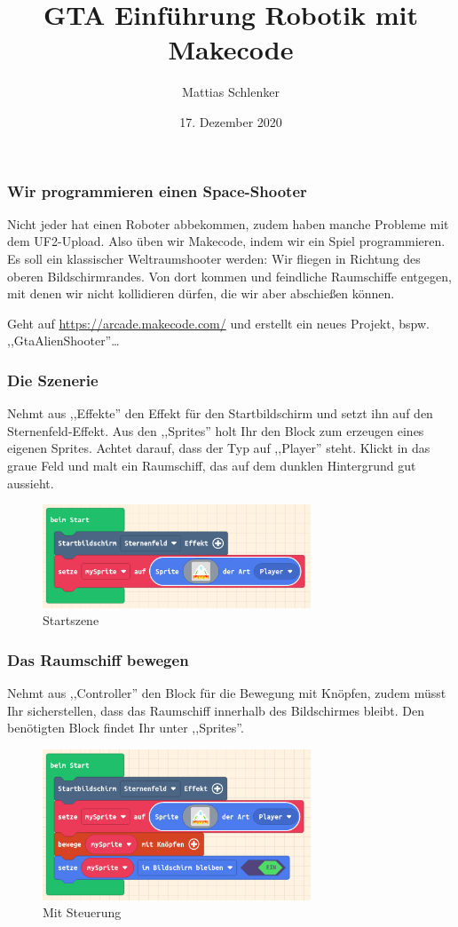 \documentclass{beamer}
\title{GTA Einführung Robotik mit Makecode}
\author{Mattias Schlenker}
\institute{Wilhelm-Ostwald-Gymnasium}
\date{17. Dezember 2020}
\begin{document}
\frame{\titlepage}

\begin{frame}
\frametitle{Wir programmieren einen Space-Shooter}

Nicht jeder hat einen Roboter abbekommen, zudem haben manche Probleme mit dem UF2-Upload. Also üben wir Makecode, indem wir ein Spiel programmieren. Es soll ein klassischer Weltraumshooter werden: Wir fliegen in Richtung des oberen Bildschirmrandes. Von dort kommen und feindliche Raumschiffe entgegen, mit denen wir nicht kollidieren dürfen, die wir aber abschießen können. 
 
Geht auf \href{https://arcade.makecode.com/}{https://arcade.makecode.com/} und erstellt ein neues Projekt, bspw. ,,GtaAlienShooter''…
 
\end{frame}
 
 \begin{frame}
 \frametitle{Die Szenerie}
 
 Nehmt aus ,,Effekte'' den Effekt für den Startbildschirm und setzt ihn auf den Sternenfeld-Effekt. Aus den ,,Sprites'' holt Ihr  den Block zum erzeugen eines eigenen Sprites. Achtet darauf, dass der Typ auf ,,Player'' steht. Klickt in das graue Feld und malt ein Raumschiff, das auf dem dunklen Hintergrund gut aussieht.
 
 
 \begin{figure}
  \includegraphics[width=8cm]{game01.png}
  \caption{Startszene}
  \label{fig:game1}
\end{figure}

\end{frame}

 \begin{frame}
 \frametitle{Das Raumschiff bewegen}
 
 Nehmt aus ,,Controller'' den Block für die Bewegung mit Knöpfen, zudem müsst Ihr sicherstellen, dass das Raumschiff innerhalb des Bildschirmes bleibt. Den benötigten Block findet Ihr unter ,,Sprites''.
 
 \begin{figure}
  \includegraphics[width=8cm]{game02.png}
  \caption{Mit Steuerung}
  \label{fig:game2}
\end{figure}

\end{frame}
\end{document}
